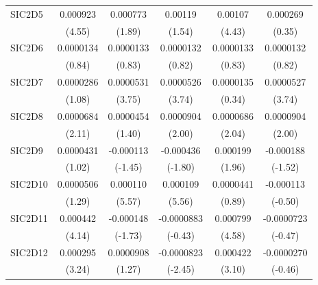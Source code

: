 \begin{table}[htbp]
\begin{tabular}{l*{5}{c}}
SIC2D5      &    0.000923\sym{***}&    0.000773         &     0.00119         &     0.00107\sym{***}&    0.000269         \\
            &      (4.55)         &      (1.89)         &      (1.54)         &      (4.43)         &      (0.35)         \\
SIC2D6      &   0.0000134         &   0.0000133         &   0.0000132         &   0.0000133         &   0.0000132         \\
            &      (0.84)         &      (0.83)         &      (0.82)         &      (0.83)         &      (0.82)         \\
SIC2D7      &   0.0000286         &   0.0000531\sym{***}&   0.0000526\sym{***}&   0.0000135         &   0.0000527\sym{***}\\
            &      (1.08)         &      (3.75)         &      (3.74)         &      (0.34)         &      (3.74)         \\
SIC2D8      &   0.0000684\sym{*}  &   0.0000454         &   0.0000904\sym{*}  &   0.0000686\sym{*}  &   0.0000904\sym{*}  \\
            &      (2.11)         &      (1.40)         &      (2.00)         &      (2.04)         &      (2.00)         \\
SIC2D9      &   0.0000431         &   -0.000113         &   -0.000436         &    0.000199\sym{*}  &   -0.000188         \\
            &      (1.02)         &     (-1.45)         &     (-1.80)         &      (1.96)         &     (-1.52)         \\
SIC2D10     &   0.0000506         &    0.000110\sym{***}&    0.000109\sym{***}&   0.0000441         &   -0.000113         \\
            &      (1.29)         &      (5.57)         &      (5.56)         &      (0.89)         &     (-0.50)         \\
SIC2D11     &    0.000442\sym{***}&   -0.000148         &  -0.0000883         &    0.000799\sym{***}&  -0.0000723         \\
            &      (4.14)         &     (-1.73)         &     (-0.43)         &      (4.58)         &     (-0.47)         \\
SIC2D12     &    0.000295\sym{**} &   0.0000908         &  -0.0000823\sym{*}  &    0.000422\sym{**} &  -0.0000270         \\
            &      (3.24)         &      (1.27)         &     (-2.45)         &      (3.10)         &     (-0.46)         \\

\end{tabular}
\end{table}
